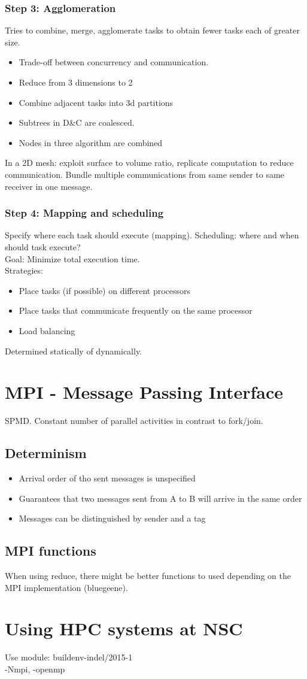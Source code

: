 \documentclass[a4paper]{article}
\begin{document}
\subsubsection{Step 3: Agglomeration}
Tries to combine, merge, agglomerate tasks to obtain fewer tasks each of greater
size.
\begin{itemize}
    \item Trade-off between concurrency and communication.
\end{itemize}
\begin{itemize}
    \item Reduce from 3 dimensions to 2
    \item Combine adjacent tasks into 3d partitions
    \item Subtrees in D\&C are coalesced.
    \item Nodes in three algorithm are combined
\end{itemize}
In a 2D mesh: exploit surface to volume ratio, replicate computation to
reduce communication. Bundle multiple communications from same sender to same
receiver in one message.
\subsubsection{Step 4: Mapping and scheduling}
Specify where each task should execute (mapping). Scheduling: where and when
should task execute?
\\Goal: Minimize total execution time.
\\Strategies:
\begin{itemize}
    \item Place tasks (if possible) on different processors
    \item Place tasks that communicate frequently on the same processor
    \item Load balancing
\end{itemize}
Determined statically of dynamically.
\section{MPI - Message Passing Interface}
SPMD. Constant number of parallel activities in contrast to fork/join.
\subsection{Determinism}
\begin{itemize}
    \item Arrival order of tho sent messages is unspecified
    \item Guarantees that two messages sent from A to B will arrive in the same
        order
    \item Messages can be distinguished by sender and a tag
\end{itemize}
\subsection{MPI functions}
When using reduce, there might be better functions to used depending on the
MPI implementation (bluegeene).
\section{Using HPC systems at NSC}
Use module: buildenv-indel/2015-1
\\-Nmpi, -openmp\\
\end{document}

